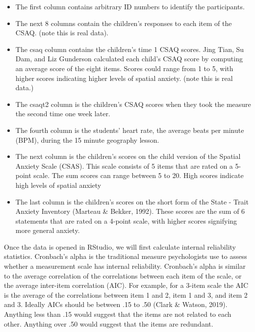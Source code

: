 \documentclass[
]{book}
\providecommand{\tightlist}{%
  \setlength{\itemsep}{0pt}\setlength{\parskip}{0pt}}
\begin{document}
\begin{itemize}
\tightlist
\item
  The first column contains arbitrary ID numbers to identify the participants.\\
\item
  The next 8 columns contain the children's responses to each item of the CSAQ. (note this is real data).\\
\item
  The csaq column contains the children's time 1 CSAQ scores. Jing Tian, Su Dam, and Liz Gunderson calculated each child's CSAQ score by computing an average score of the eight items. Scores could range from 1 to 5, with higher scores indicating higher levels of spatial anxiety. (note this is real data.)\\
\item
  The csaqt2 column is the children's CSAQ scores when they took the measure the second time one week later.\\
\item
  The fourth column is the students' heart rate, the average beats per minute (BPM), during the 15 minute geography lesson.\\
\item
  The next column is the children's scores on the child version of the Spatial Anxiety Scale (CSAS). This scale consists of 5 items that are rated on a 5-point scale. The sum scores can range between 5 to 20. High scores indicate high levels of spatial anxiety\\
\item
  The last column is the children's scores on the short form of the State - Trait Anxiety Inventory (Marteau \& Bekker, 1992). These scores are the sum of 6 statements that are rated on a 4-point scale, with higher scores signifying more general anxiety.
\end{itemize}

Once the data is opened in RStudio, we will first calculate internal reliability statistics. Cronbach's alpha is the traditional measure psychologists use to assess whether a measurement scale has internal reliability. Cronbach's alpha is similar to the average correlation of the correlations between each item of the scale, or the average inter-item correlation (AIC). For example, for a 3-item scale the AIC is the average of the correlations between item 1 and 2, item 1 and 3, and item 2 and 3. Ideally AICs should be between .15 to .50 (Clark \& Watson, 2019). Anything less than .15 would suggest that the items are not related to each other. Anything over .50 would suggest that the items are redundant.
\end{document}
